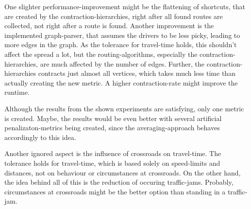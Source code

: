    One slighter performance-improvement might be the flattening of shortcuts, that are created by the contraction-hierarchies, right after all found routes are collected, not right after a route is found.
    Another improvement is the implemented graph-parser, that assumes the drivers to be less picky, leading to more edges in the graph.
    As the tolerance for travel-time holds, this shouldn't affect the spread a lot, but the routing-algorithms, especially the contraction-hierarchies, are much affected by the number of edges.
    Further, the contraction-hierarchies contracts just almost all vertices, which takes much less time than actually creating the new metric.
    A higher contraction-rate might improve the runtime.

    Although the results from the shown experiments are satisfying, only one metric is created.
    Maybe, the results would be even better with several artificial penalizaton-metrics being created, since the averaging-approach behaves accordingly to this idea.

    Another ignored aspect is the influence of crossroads on travel-time.
    The tolerance holds for travel-time, which is based solely on speed-limits and distances, not on behaviour or circumstances at crossroads.
    On the other hand, the idea behind all of this is the reduction of occuring traffic-jams.
    Probably, circumstances at crossroads might be the better option than standing in a traffic-jam.